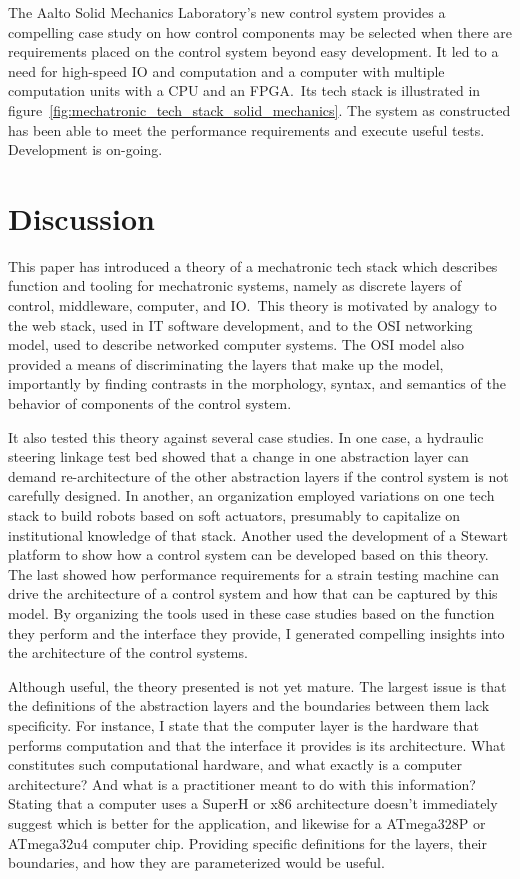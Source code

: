 \documentclass[english,12pt,a4paper,pdftex,eng,utf8]{aaltothesis}
\begin{document}
The Aalto Solid Mechanics Laboratory's new control system provides a compelling case study on how control components may be selected when there are requirements placed on the control system beyond easy development.  It led to a need for high-speed IO and computation and a computer with multiple computation units with a CPU and an FPGA.\  Its tech stack is illustrated in figure~\ref{fig:mechatronic_tech_stack_solid_mechanics}.  The system as constructed has been able to meet the performance requirements and execute useful tests.  Development is on-going.

\clearpage


\section{Discussion}

This paper has introduced a theory of a mechatronic tech stack which describes function and tooling for mechatronic systems, namely as discrete layers of control, middleware, computer, and IO.\  This theory is motivated by analogy to the web stack, used in IT software development, and to the OSI networking model, used to describe networked computer systems.  The OSI model also provided a means of discriminating the layers that make up the model, importantly by finding contrasts in the morphology, syntax, and semantics of the behavior of components of the control system.

It also tested this theory against several case studies.  In one case, a hydraulic steering linkage test bed showed that a change in one abstraction layer can demand re-architecture of the other abstraction layers if the control system is not carefully designed.  In another, an organization employed variations on one tech stack to build robots based on soft actuators, presumably to capitalize on institutional knowledge of that stack.  Another used the development of a Stewart platform to show how a control system can be developed based on this theory.  The last showed how performance requirements for a strain testing machine can drive the architecture of a control system and how that can be captured by this model.  By organizing the tools used in these case studies based on the function they perform and the interface they provide, I generated compelling insights into the architecture of the control systems.

Although useful, the theory presented is not yet mature.  The largest issue is that the definitions of the abstraction layers and the boundaries between them lack specificity.  For instance, I state that the computer layer is the hardware that performs computation and that the interface it provides is its architecture.  What constitutes such computational hardware, and what exactly is a computer architecture?  And what is a practitioner meant to do with this information?  Stating that a computer uses a SuperH or x86 architecture doesn't immediately suggest which is better for the application, and likewise for a ATmega328P or ATmega32u4 computer chip.  Providing specific definitions for the layers, their boundaries, and how they are parameterized would be useful.
\end{document}

